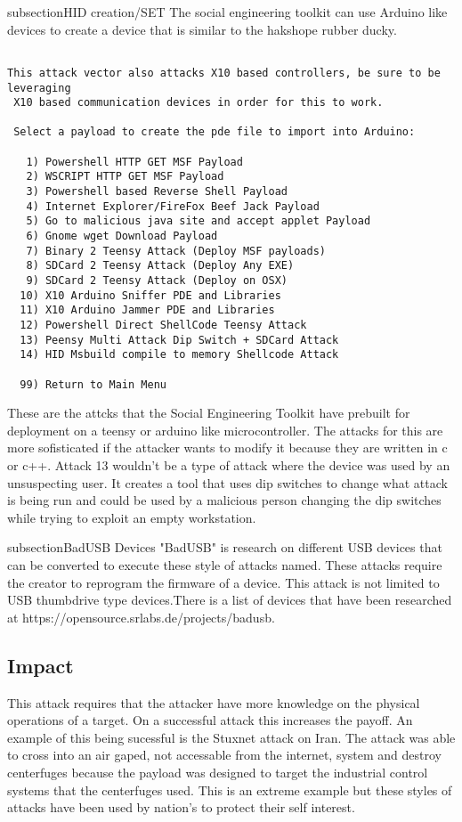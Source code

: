 subsection{HID creation/SET}
The social engineering toolkit can use Arduino like devices to create a device that is similar to the hakshope rubber ducky.
\begin{verbatim}

This attack vector also attacks X10 based controllers, be sure to be leveraging
 X10 based communication devices in order for this to work.

 Select a payload to create the pde file to import into Arduino:

   1) Powershell HTTP GET MSF Payload
   2) WSCRIPT HTTP GET MSF Payload
   3) Powershell based Reverse Shell Payload
   4) Internet Explorer/FireFox Beef Jack Payload
   5) Go to malicious java site and accept applet Payload
   6) Gnome wget Download Payload
   7) Binary 2 Teensy Attack (Deploy MSF payloads)
   8) SDCard 2 Teensy Attack (Deploy Any EXE)
   9) SDCard 2 Teensy Attack (Deploy on OSX)
  10) X10 Arduino Sniffer PDE and Libraries
  11) X10 Arduino Jammer PDE and Libraries
  12) Powershell Direct ShellCode Teensy Attack
  13) Peensy Multi Attack Dip Switch + SDCard Attack
  14) HID Msbuild compile to memory Shellcode Attack

  99) Return to Main Menu

\end{verbatim}

These are the attcks that the Social Engineering Toolkit have prebuilt for deployment on a teensy or arduino like microcontroller. The attacks for this are more sofisticated if the attacker wants to modify it because they are written in c or c++. Attack 13 wouldn't be a type of attack where the device was used by an unsuspecting user. It creates a tool that uses dip switches to change what attack is being run and could be used by a malicious person changing the dip switches while trying to exploit an empty workstation.

subsection{BadUSB Devices}
"BadUSB" is research on different USB devices that can be converted to execute these style of attacks named. These attacks require the creator to reprogram the firmware of a device. This attack is not limited to USB thumbdrive type devices.There is a list of devices that have been researched at https://opensource.srlabs.de/projects/badusb.

\subsection{Impact}
This attack requires that the attacker have more knowledge on the physical operations of a target. On a successful attack this increases the payoff. An example of this being sucessful is the Stuxnet attack on Iran. The attack was able to cross into an air gaped, not accessable from the internet, system and destroy centerfuges because the payload was designed to target the industrial control systems that the centerfuges used. This is an extreme example but these styles of attacks have been used by nation's to protect their self interest.\\



